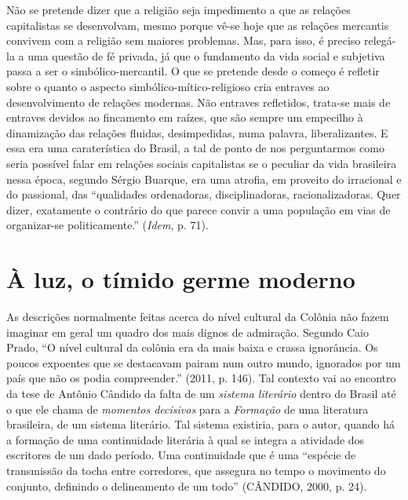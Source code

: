 Não se pretende dizer que a religião seja impedimento a que as relações
capitalistas se desenvolvam, mesmo porque vê-se hoje que as relações
mercantis convivem com a religião sem maiores problemas. Mas, para isso,
é preciso relegá-la a uma questão de fé privada, já que o fundamento da
vida social e subjetiva passa a ser o simbólico-mercantil. O que se
pretende desde o começo é refletir sobre o quanto o aspecto
simbólico-mítico-religioso cria entraves ao desenvolvimento de relações
modernas. Não entraves refletidos, trata-se mais de entraves devidos ao
fincamento em raízes, que são sempre um empecilho à dinamização das
relações fluidas, desimpedidas, numa palavra, liberalizantes. E essa era
uma caraterística do Brasil, a tal de ponto de nos perguntarmos como
seria possível falar em relações sociais capitalistas se o peculiar da
vida brasileira nessa época, segundo Sérgio Buarque, era uma atrofia, em
proveito do irracional e do passional, das ``qualidades ordenadoras,
disciplinadoras, racionalizadoras. Quer dizer, exatamente o contrário do
que parece convir a uma população em vias de organizar-se
politicamente.'' (\emph{Idem}, p. 71).

\section{À luz, o tímido germe moderno}

As descrições normalmente feitas acerca do nível cultural da Colônia não
fazem imaginar em geral um quadro dos mais dignos de admiração. Segundo
Caio Prado, ``O nível cultural da colônia era da mais baixa e crassa
ignorância. Os poucos expoentes que se destacavam pairam num outro
mundo, ignorados por um país que não os podia compreender.'' (2011, p.
146). Tal contexto vai ao encontro da tese de Antônio Cândido da falta
de um \emph{sistema literário} dentro do Brasil até o que ele chama de
\emph{momentos decisivos} para a \emph{Formação} de uma literatura
brasileira, de um sistema literário. Tal sistema existiria, para o
autor, quando há a formação de uma continuidade literária à qual se
integra a atividade dos escritores de um dado período. Uma continuidade
que é uma ``espécie de transmissão da tocha entre corredores, que
assegura no tempo o movimento do conjunto, definindo o delineamento de
um todo'' (CÂNDIDO, 2000, p. 24).


